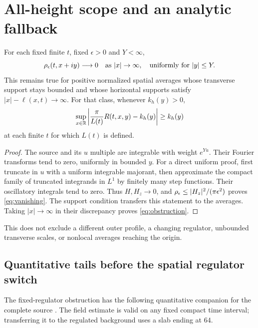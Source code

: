 \section{All-height scope and an analytic fallback}\label{sec:global}
\begin{proposition}\label{prop:obstruction}
For each fixed finite $t$, fixed $\epsilon>0$ and $Y<\infty$,
\begin{equation}
 \rho_\epsilon(t,x+iy)\longrightarrow0
 \quad\hbox{as }|x|\to\infty,\quad\hbox{uniformly for }|y|\le Y.
 \label{eq:vanishing}
\end{equation}
This remains true for positive normalized spatial averages whose
transverse support stays bounded and whose horizontal supports satisfy
$|x|-\ell(x,t)\to\infty$.
For that class, whenever $k_h(y)>0$,
\begin{equation}
 \sup_{x\in\mathbb R}\left|\frac{\pi}{L(t)}R(t,x,y)-k_h(y)\right|
 \ge k_h(y)
 \label{eq:obstruction}
\end{equation}
at each finite $t$ for which $L(t)$ is defined.
\end{proposition}
\begin{proof}
The source and its $u$ multiple are integrable with weight $e^{Yu}$.
Their Fourier transforms tend to zero, uniformly in bounded $y$.
For a direct uniform proof, first truncate in $u$ with a uniform
integrable majorant, then approximate the compact family of truncated
integrands in $L^1$ by finitely many step functions.
Their oscillatory integrals tend to zero.
Thus $H,H_z\to0$, and $\rho_\epsilon\le |H_z|^2/(\pi\epsilon^2)$ proves
\eqref{eq:vanishing}. The support condition transfers this statement
to the averages. Taking $|x|\to\infty$ in their discrepancy proves
\eqref{eq:obstruction}.
\end{proof}
This does not exclude a different outer profile, a changing regulator,
unbounded transverse scales, or nonlocal averages reaching the origin.


\subsection{Quantitative tails before the spatial regulator switch}
The fixed-regulator obstruction has the following quantitative companion
for the complete source \cite{n25}. The field estimate is valid on any
fixed compact time interval; transferring it to the regulated background
uses a slab ending at $64$.

